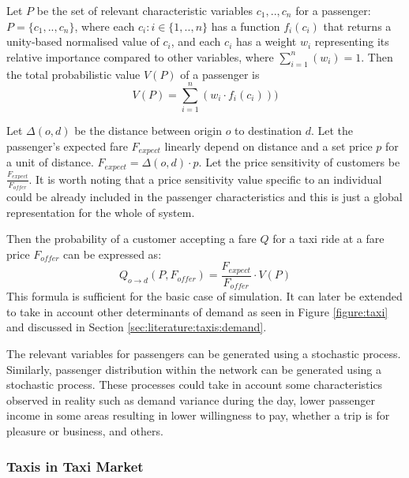 Let \(P\) be the set of relevant characteristic variables \(c_1,..,c_n\) for a
passenger: \(P = \{c_1,..,c_n\}\), \newline
where each \(c_i : i \in \{1, .., n\}\) has a function \(f_i (c_i) \) that
returns a unity-based normalised value of \(c_i\), \newline
and each \(c_i\) has a weight \(w_i\) representing its relative importance
compared to other variables, where \(\sum_{i=1}^n (w_i) = 1 \). \newline
Then the total probabilistic value \(V(P)\) of a passenger is \[ V(P) =
\sum_{i=1}^{n} (w_i \cdot f_i(c_i) )) \] \newline

Let \(\Delta(o,d)\) be the distance between origin \(o\) to destination \(d\). 
\newline
Let the passenger's expected fare \(F_{expect}\) linearly depend on distance
and a set price \(p\) for a unit of distance. \(F_{expect} = \Delta(o,d) \cdot
p \). \newline
Let the price sensitivity of customers be \(\frac{F_{expect}}{F_{offer}}\). It
is worth noting that a price sensitivity value specific to an individual could
be already included in the passenger characteristics and this is just a global
representation for the whole of system. \newline

Then the probability of a customer accepting a fare \(Q\) for a taxi ride at a
fare price \(F_{offer}\) can be expressed as: 
\begin{equation} 
  \label{eq:requirements:demand}
  Q_{o \rightarrow d} (P,F_{offer}) = \frac{F_{expect}}{F_{offer}} \cdot V(P)
\end{equation}
This formula is sufficient for the basic case of simulation. It can later be
extended to take in account other determinants of demand as seen in Figure
\ref{figure:taxi} and discussed in Section \ref{sec:literature:taxis:demand}.

The relevant variables for passengers can be generated using a stochastic
process. Similarly, passenger distribution within the network can be generated
using a stochastic process. These processes could take in account some
characteristics observed in reality such as demand variance during the day,
lower passenger income in some areas resulting in lower willingness to pay,
whether a trip is for pleasure or business, and others.


\subsubsection{Taxis in Taxi Market}
\label{sec:requirements:taxi}

